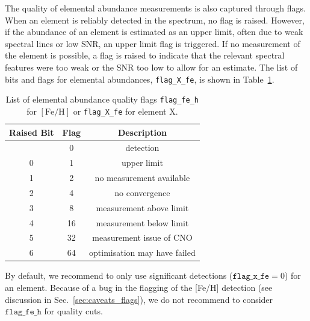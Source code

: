 \documentclass[
  journal=pasa,
  manuscript=research-paper, %
  year=2024,
  volume=37
]{cup-journal}
\newcommand{\feh}{$\mathrm{[Fe/H]}$\xspace}
\begin{document}
The quality of elemental abundance measurements is also captured through flags. When an element is reliably detected in the spectrum, no flag is raised. However, if the abundance of an element is estimated as an upper limit, often due to weak spectral lines or low SNR, an upper limit flag is triggered. If no measurement of the element is possible, a flag is raised to indicate that the relevant spectral features were too weak or the SNR too low to allow for an estimate. The list of bits and flags for elemental abundances, \texttt{flag\_X\_fe}, is shown in Table~\ref{tab:flag_x_fe}.

\begin{table}
\centering
\caption{List of elemental abundance quality flags \texttt{flag\_fe\_h} for \feh or \texttt{flag\_X\_fe} for element X.}
\label{tab:flag_x_fe}
\begin{tabular}{ccc}
\hline \hline
Raised Bit & Flag & Description \\
\hline
  & 0 & detection \\ 
0 & 1 & upper limit \\ 
1 & 2 & no measurement available\\
2 & 4 & no convergence\\
3 & 8 & measurement above limit\\
4 & 16 & measurement below limit\\
5 & 32 & measurement issue of CNO \\
6 & 64 & optimisation may have failed \\
\hline
\end{tabular}
\end{table}

By default, we recommend to only use significant detections ($\texttt{flag\_x\_fe} = 0$) for an element. Because of a bug in the flagging of the [Fe/H] detection (see discussion in Sec.~\ref{sec:caveats_flags}), we do not recommend to consider $\texttt{flag\_fe\_h}$ for quality cuts.
\end{document}
